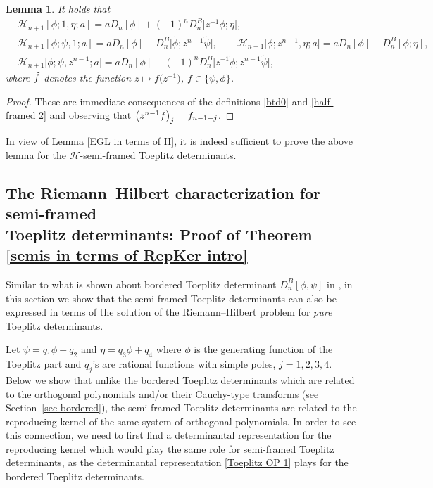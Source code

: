 \documentclass[pdftex]{sigma}
\numberwithin{equation}{section}
\newtheorem{Lemma}[Theorem]{Lemma}
 { \theoremstyle{definition}
\newtheorem{Definition}[Theorem]{Definition}
\newtheorem{Example}[Theorem]{Example}
\newtheorem{Remark}[Theorem]{Remark}
\newtheorem{Question}[Theorem]{Question}
}
\begin{document}
		\begin{Lemma}
			It holds that
			\begin{align*}
				& \mathscr{H}_{n+1}[\phi;1,\eta;a] = a D_{n}[\phi] + (-1)^{n} D^B_{n}\big[z^{-1}\phi;\eta\big], \\
				& \mathscr{H}_{n+1}[\phi;\psi,1;a] = a D_{n}[\phi] - D^B_{n}\big[\tilde{\phi};z^{n-1} \tilde{\psi}\big], \qquad \mathscr{H}_{n+1}\big[\phi;z^{n-1},\eta;a\big] = a D_{n}[\phi] - D^B_{n}[\phi;\eta], \\
				& \mathscr{H}_{n+1}\big[\phi;\psi,z^{n-1};a\big] = a D_{n}[\phi] + (-1)^n D^B_{n}\big[z^{-1}\tilde{\phi};z^{n-1} \tilde{\psi}\big],
			\end{align*}
			where $\Tilde{f}$ denotes the function $z \mapsto f\big(z^{-1}\big)$, $f \in \{\psi,\phi\}$.
		\end{Lemma}
		\begin{proof}
			These are immediate consequences of the definitions \eqref{btd0} and \eqref{half-framed 2} and observing that $\big( z^{n-1}\Tilde{f} \big)_j = f_{n-1-j}$.
		\end{proof}
		
		\begin{Remark}
		In view of Lemma \ref{EGL in terms of H}, it is indeed sufficient to prove the above lemma for the $\mathscr{H}$-semi-framed Toeplitz determinants.
		\end{Remark}
		
		\subsection[The Riemann--Hilbert characterization for semi-framed Toeplitz determinants:\\ Proof of Theorem 1.11]{The Riemann--Hilbert characterization for semi-framed \\ Toeplitz determinants: Proof of Theorem \ref{semis in terms of RepKer intro}}

		Similar to what is shown about bordered Toeplitz determinant $D^B_n[\phi,\psi]$ in \cite[Section 2]{BEGIL}, in this section we show that the semi-framed Toeplitz determinants can also be expressed in terms of the solution of the Riemann--Hilbert problem for \textit{pure} Toeplitz determinants.
		
		Let $\psi=q_1 \phi + q_2$ and $\eta=q_3 \phi + q_4$ where $\phi$ is the generating function of the Toeplitz part and $q_j$'s are rational functions with simple poles, $j=1,2,3,4$. Below we show that unlike the bordered Toeplitz determinants which are related to the orthogonal polynomials and/or their Cauchy-type transforms (see Section~\ref{sec bordered}), the semi-framed Toeplitz determinants are related to the reproducing kernel of the same system of orthogonal polynomials. In order to see this connection, we need to first find a determinantal representation for the reproducing kernel which would play the same role for semi-framed Toeplitz determinants, as the determinantal representation \eqref{Toeplitz OP 1} plays for the bordered Toeplitz determinants.
		
\end{document}

